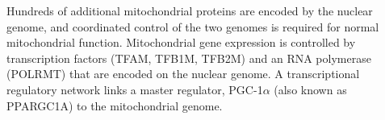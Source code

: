 \begin{table}[htbp]
\begin{minipage}{\textwidth}
\caption{Selected Mitochondrial Diseases}
\label{intro.table.mito_disease}
\noindent{}
\end{minipage}
\end{table}

Hundreds of additional mitochondrial proteins are encoded by the nuclear genome, and coordinated control of the two genomes is required for normal mitochondrial function\cite{hock2009transcriptional,ryan2007mitochondrial}.  Mitochondrial gene expression is controlled by transcription factors (TFAM, TFB1M, TFB2M) and an RNA polymerase (POLRMT) that are encoded on the nuclear genome.  A transcriptional regulatory network links a master regulator, PGC-1$\alpha$ (also known as PPARGC1A) to the mitochondrial genome.

